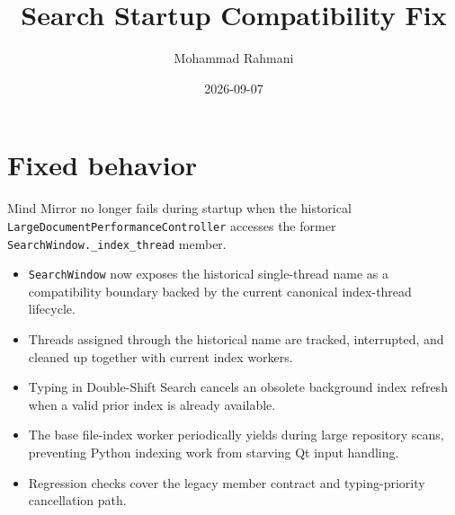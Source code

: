 \documentclass[a4paper]{article}
\title{Search Startup Compatibility Fix}
\date{2026-09-07}
\author{Mohammad Rahmani}
\begin{document}
   \maketitle

   \section{Fixed behavior}

   Mind Mirror no longer fails during startup when the historical
   \verb|LargeDocumentPerformanceController| accesses the former
   \verb|SearchWindow._index_thread| member.

   \begin{itemize}
      \item \verb|SearchWindow| now exposes the historical single-thread name as a
      compatibility boundary backed by the current canonical index-thread lifecycle.
      \item Threads assigned through the historical name are tracked, interrupted, and
      cleaned up together with current index workers.
      \item Typing in Double-Shift Search cancels an obsolete background index refresh
      when a valid prior index is already available.
      \item The base file-index worker periodically yields during large repository scans,
      preventing Python indexing work from starving Qt input handling.
      \item Regression checks cover the legacy member contract and typing-priority
      cancellation path.
   \end{itemize}

   
   
\end{document}
